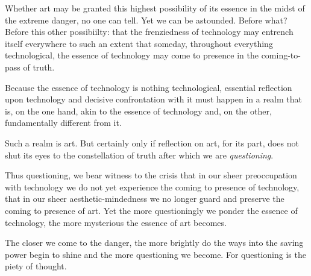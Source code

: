 Whether art may be granted this highest possibility of its essence in the midst of the extreme danger, no one can tell. Yet we can be astounded. Before what? Before this other possibiilty: that the frenziedness of technology may entrench itself everywhere to such an extent that someday, throughout everything technological, the essence of technology may come to presence in the coming-to-pass of truth.

Because the essence of technology is nothing technological, essential reflection upon technology and decisive confrontation with it must happen in a realm that is, on the one hand, akin to the essence of technology and, on the other, fundamentally different from it.

Such a realm is art. But certainly only if reflection on art, for its part, does not shut its eyes to the constellation of truth after which we are \textit{questioning}.

Thus questioning, we bear witness to the crisis that in our sheer preoccupation with technology we do not yet experience the coming to presence of technology, that in our sheer aesthetic-mindedness we no longer guard and preserve the coming to presence of art. Yet the more questioningly we ponder the essence of technology, the more mysterious the essence of art becomes.

The closer we come to the danger, the more brightly do the ways into the saving power begin to shine and the more questioning we become. For questioning is the piety of thought.
